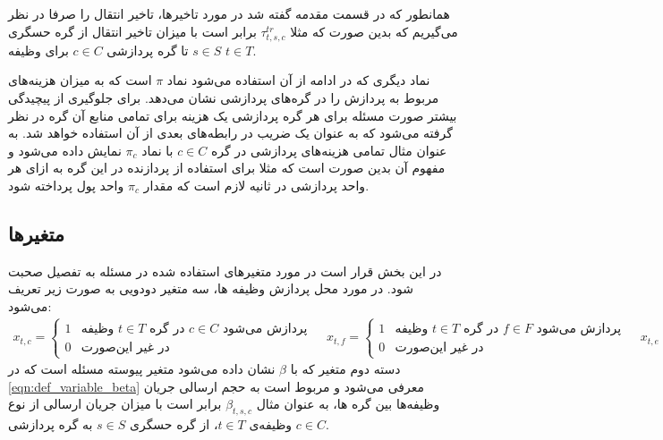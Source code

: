 	همانطور که در قسمت مقدمه گفته شد در مورد تاخیرها، تاخیر انتقال را صرفا در نظر می‌گیریم که بدین صورت که مثلا $\tau_{t,s,c}^{tr}$ برابر است با میزان تاخیر انتقال از گره حسگری $s \in S$ تا گره پردازشی $c \in C$ برای وظیفه $t \in T$.
	
	نماد دیگری که در ادامه از آن استفاده می‌شود نماد $\pi$ است که به میزان هزینه‌های مربوط به پردازش را در گره‌های پردازشی نشان می‌دهد. برای جلوگیری از پیچیدگی بیشتر صورت مسئله برای هر گره پردازشی یک هزینه برای تمامی منابع آن گره در نظر گرفته می‌شود که به عنوان یک ضریب در رابطه‌های بعدی از آن استفاده خواهد شد. به عنوان مثال تمامی هزینه‌های پردازشی در گره $c \in C$ با نماد $\pi_c$ نمایش داده می‌شود و مفهوم آن بدین صورت است که مثلا برای استفاده از پردازنده در این گره به ازای هر واحد پردازشی در ثانیه لازم است که مقدار $\pi_c$ واحد پول پرداخته شود. 
	\subsection{متغیرها}
	در این بخش قرار است در مورد متغیرهای استفاده شده در مسئله به تفصیل صحبت شود. 
	در مورد محل پردازش وظیفه ها، سه متغیر دودویی به صورت زیر تعریف می‌شود:
	    \begin{subequations}\label{eqn:def_variable_x}
		\begin{align}
			x_{t,c} =
			\begin{cases}
				1 & \text{وظیفه $t \in T$ در گره $c \in C$ پردازش می‌شود } \\
				0 & \text{در غیر این‌صورت}
			\end{cases}
		\end{align}
		\begin{align}
			x_{t,f} =
			\begin{cases}
				1 & \text{وظیفه $t \in T$ در گره $f \in F$ پردازش می‌شود } \\
				0 & \text{در غیر این‌صورت}
			\end{cases}
		\end{align}
		\begin{align}
			x_{t,e} =
			\begin{cases}
				1 & \text{وظیفه $t \in T$ در گره $e \in E$ پردازش می‌شود } \\
				0 & \text{در غیر این‌صورت}
			\end{cases}
		\end{align}
	\end{subequations}
	دسته دوم متغیر که با $\beta$ نشان داده می‌شود متغیر پیوسته مسئله است که در \cref{eqn:def_variable_beta} معرفی می‌شود و مربوط است به حجم ارسالی جریان وظیفه‌ها بین گره ها، به عنوان مثال $\beta_{t,s,c}$ برابر است با میزان جریان ارسالی از نوع وظیفه‌ی $t \in T$، از گره حسگری $s \in S$ به گره پردازشی $c \in C$.
